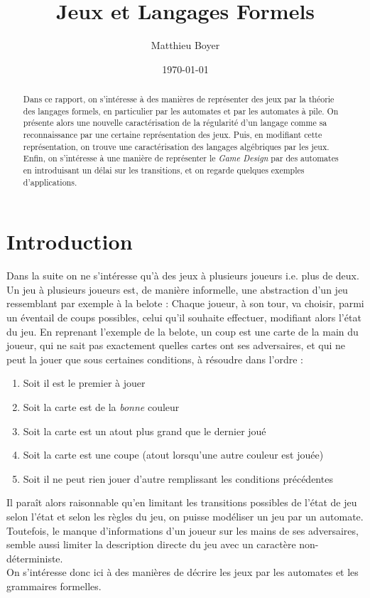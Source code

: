 \documentclass{cours}
\title{Jeux et Langages Formels}
\author{Matthieu Boyer}
\date{\today}
\begin{document}
\begin{abstract}
    Dans ce rapport, on s'intéresse à des manières de représenter des jeux par la théorie des langages formels, en particulier par les automates et par les automates à pile. On présente alors une nouvelle caractérisation de la régularité d'un langage comme sa reconnaissance par une certaine représentation des jeux. Puis, en modifiant cette représentation, on trouve une caractérisation des langages algébriques par les jeux. Enfin, on s'intéresse à une manière de représenter le \textit{Game Design} par des automates en introduisant un délai sur les transitions, et on regarde quelques exemples d'applications.
\end{abstract}

\section*{Introduction}
Dans la suite on ne s'intéresse qu'à des jeux à plusieurs joueurs i.e. plus de deux.\\
Un jeu à plusieurs joueurs est, de manière informelle, une abstraction d'un jeu ressemblant par exemple à la belote : Chaque joueur, à son tour, va choisir, parmi un éventail de coups possibles, celui qu'il souhaite effectuer, modifiant alors l'état du jeu. En reprenant l'exemple de la belote, un coup est une carte de la main du joueur, qui ne sait pas exactement quelles cartes ont ses adversaires, et qui ne peut la jouer que sous certaines conditions, à résoudre dans l'ordre :
\begin{enumerate}
    \item Soit il est le premier à jouer
    \item Soit la carte est de la \textit{bonne} couleur
    \item Soit la carte est un atout plus grand que le dernier joué
    \item Soit la carte est une coupe (atout lorsqu'une autre couleur est jouée)
    \item Soit il ne peut rien jouer d'autre remplissant les conditions précédentes
\end{enumerate}
Il paraît alors raisonnable qu'en limitant les transitions possibles de l'état de jeu selon l'état et selon les règles du jeu, on puisse modéliser un jeu par un automate. Toutefois, le manque d'informations d'un joueur sur les mains de ses adversaires, semble aussi limiter la description directe du jeu avec un caractère non-déterministe. \\
On s'intéresse donc ici à des manières de décrire les jeux par les automates et les grammaires formelles.
\end{document}
